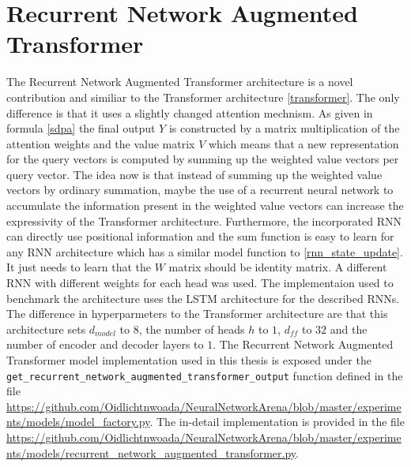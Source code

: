 \documentclass[draft,final]{vutinfth} %
\begin{document}
    \section{Recurrent Network Augmented Transformer} \label{rnaut}
    The Recurrent Network Augmented Transformer architecture is a novel contribution and similiar to the Transformer architecture \ref{transformer}.
    The only difference is that it uses a slightly changed attention mechnism.
    As given in formula \ref{sdpa} the final output $Y$ is constructed by a matrix multiplication of the attention weights and the value matrix $V$ which means that a new representation for the query vectors is computed by summing up the weighted value vectors per query vector.
    The idea now is that instead of summing up the weighted value vectors by ordinary summation, maybe the use of a recurrent neural network to accumulate the information present in the weighted value vectors can increase the expressivity of the Transformer architecture.
    Furthermore, the incorporated RNN can directly use positional information and the sum function is easy to learn for any RNN architecture which has a similar model function to \ref{rnn_state_update}.
    It just needs to learn that the $W$ matrix should be identity matrix.
    A different RNN with different weights for each head was used. 
    The implementaion used to benchmark the architecture uses the LSTM architecture for the described RNNs.
    The difference in hyperparmeters to the Transformer architecture are that this architecture sets $d_{model}$ to $8$, the number of heads $h$ to $1$, $d_{ff}$ to $32$ and the number of encoder and decoder layers to $1$.
    The Recurrent Network Augmented Transformer model implementation used in this thesis is exposed under the \texttt{get\_recurrent\_network\_augmented\_transformer\_output} function defined in the file \url{https://github.com/Oidlichtnwoada/NeuralNetworkArena/blob/master/experiments/models/model_factory.py}.
    The in-detail implementation is provided in the file \url{https://github.com/Oidlichtnwoada/NeuralNetworkArena/blob/master/experiments/models/recurrent_network_augmented_transformer.py}.
\end{document}
